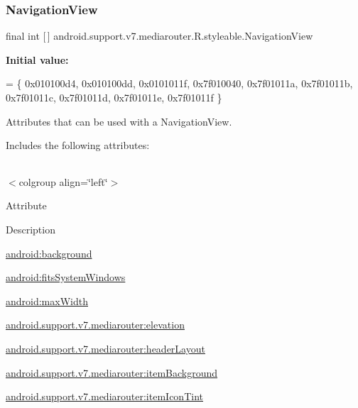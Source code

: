 \subsubsection{\texorpdfstring{Navigation\+View}{NavigationView}}
{\footnotesize\ttfamily final int \mbox{[}$\,$\mbox{]} android.\+support.\+v7.\+mediarouter.\+R.\+styleable.\+Navigation\+View\hspace{0.3cm}{\ttfamily [static]}}

{\bfseries Initial value\+:}
\begin{DoxyCode}
= \{
            0x010100d4, 0x010100dd, 0x0101011f, 0x7f010040,
            0x7f01011a, 0x7f01011b, 0x7f01011c, 0x7f01011d,
            0x7f01011e, 0x7f01011f
        \}
\end{DoxyCode}
Attributes that can be used with a Navigation\+View. 

Includes the following attributes\+:

\tabulinesep=1mm
\begin{longtabu} spread 0pt [c]{*{0}{|X[-1]}|}
\hline
\end{longtabu}
$<$colgroup align=\char`\"{}left\char`\"{}$>$ 

Attribute

Description 

{\ttfamily \hyperlink{classandroid_1_1support_1_1v7_1_1mediarouter_1_1R_1_1styleable_a377c12b1e75fabeed8b4da7b123dca1b}{android\+:background}}

{\ttfamily \hyperlink{classandroid_1_1support_1_1v7_1_1mediarouter_1_1R_1_1styleable_a345af5a862cf8b50fd6a909bde02ea92}{android\+:fits\+System\+Windows}}

{\ttfamily \hyperlink{classandroid_1_1support_1_1v7_1_1mediarouter_1_1R_1_1styleable_a58c9f837fbc6a2fbcbfdbd7a8a1c117e}{android\+:max\+Width}}

{\ttfamily \hyperlink{classandroid_1_1support_1_1v7_1_1mediarouter_1_1R_1_1styleable_a9adfb6c1531f42fcb13fc779ad226cba}{android.\+support.\+v7.\+mediarouter\+:elevation}}

{\ttfamily \hyperlink{classandroid_1_1support_1_1v7_1_1mediarouter_1_1R_1_1styleable_a7b1715c8e39e70061cbfe8406b79ca36}{android.\+support.\+v7.\+mediarouter\+:header\+Layout}}

{\ttfamily \hyperlink{classandroid_1_1support_1_1v7_1_1mediarouter_1_1R_1_1styleable_a0e5c6e8724e0794382e48dafeb5fcbb3}{android.\+support.\+v7.\+mediarouter\+:item\+Background}}

{\ttfamily \hyperlink{classandroid_1_1support_1_1v7_1_1mediarouter_1_1R_1_1styleable_aa391656f8e7f8b9e6d640d174be638d3}{android.\+support.\+v7.\+mediarouter\+:item\+Icon\+Tint}}

